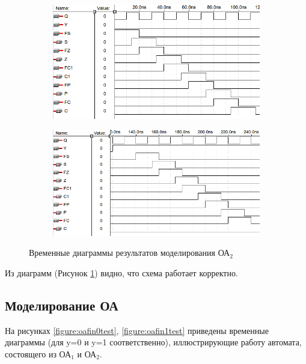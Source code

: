\begin{figure}[H]
	\begin{subfigure}[b]{0.6\textwidth}
		\includegraphics[scale=0.6]{images/altera/test2_WITH_CONTROL_SIGNAL_Y=0.png}
		\caption{}
	\end{subfigure}

	\begin{subfigure}[b]{0.6\textwidth}
		\includegraphics[scale=0.6]{images/altera/test2_WITH_CONTROL_SIGNAL_Y=1.png}
		\caption{}
	\end{subfigure}
	\caption{Временные диаграммы результатов моделирования ОА$_2$}
	\label{figure:oa2test}
\end{figure}

Из диаграмм (Рисунок \ref{figure:oa2test}) видно, что схема работает корректно.

\clearpage
\subsection{Моделирование ОА}

На рисунках \ref{figure:oafin0test}, \ref{figure:oafin1test} приведены временные диаграммы (для y=0 и y=1 соответственно), иллюстрирующие работу автомата, состоящего из ОА$_1$ и ОА$_2$.

